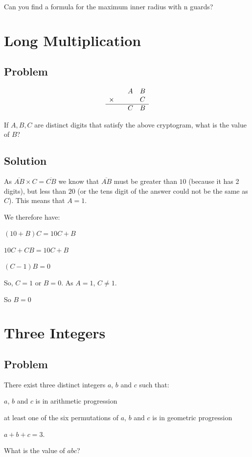 \documentclass{book}
\begin{document}
Can you find a formula for the maximum inner radius with n guards?
\newpage


\section{Long Multiplication}
\subsection{Problem}
\[ \begin{array} { l l l l }
& & A & B \\ \times & & & C \\ \hline & & C & B \\ \end{array} \]

If \( A, B, C \) are distinct digits that satisfy the above cryptogram, what is the value of \(B\)?
\subsection{Solution}
As \(\overline{AB}\times C = \overline{CB}\) we know that \(\overline{AB}\) must be greater than \(10\) (because it has 2 digits), but less than \(20\) (or the tens digit of the answer could not be the same as \(C\)). This means that \(A=1\).

We therefore have:

\((10+B)C=10C+B\)

\(10C+CB=10C+B\)

\((C-1)B=0\)

So, \(C=1\) or \(B=0\). As \(A=1\), \(C\neq 1\).

So \(\boxed{B=0}\)

\newpage

\section{Three Integers}
\subsection{Problem}
There exist three distinct integers \(a\), \(b\) and \(c\) such that:

\(a\), \(b\) and \(c\) is in arithmetic progression

at least one of the six permutations of \(a\), \(b\) and \(c\) is in geometric progression

\(a+b+c=3\).

What is the value of \(abc\)?
\end{document}
